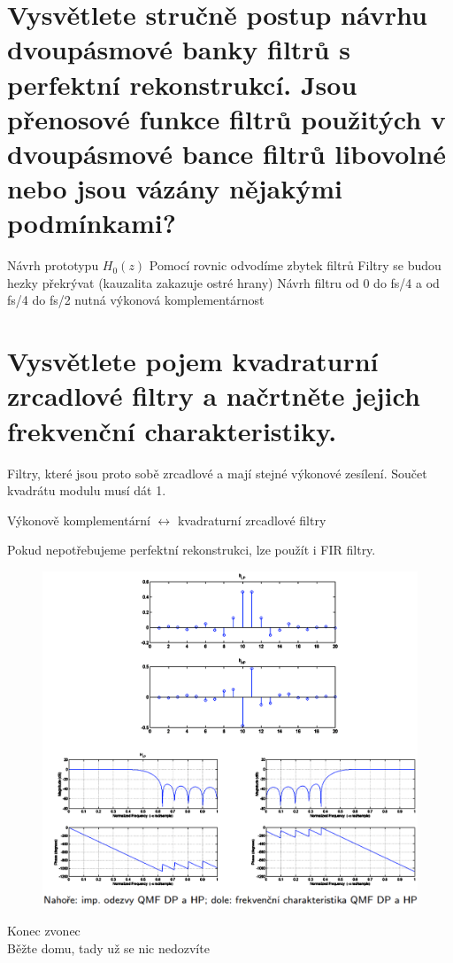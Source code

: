\documentclass[a4paper,12pt]{article}   %
\newcommand{\mt}[1]{$#1$}
\begin{document}
\FloatBarrier
\section{Vysvětlete stručně postup návrhu dvoupásmové banky filtrů s perfektní rekonstrukcí. Jsou přenosové funkce filtrů použitých v dvoupásmové bance filtrů libovolné nebo jsou vázány nějakými podmínkami?}

\begin{outline}[enumerate]
        \1 Návrh prototypu \mt{H_0(z)}
        \1 Pomocí rovnic odvodíme zbytek filtrů
                \2 Filtry se budou hezky překrývat (kauzalita zakazuje ostré hrany)
        \1 Návrh filtru od 0 do fs/4 a od fs/4 do fs/2
                \2 nutná výkonová komplementárnost
\end{outline}



\section{Vysvětlete pojem kvadraturní zrcadlové filtry a načrtněte jejich frekvenční charakteristiky.}

Filtry, které jsou proto sobě zrcadlové a mají stejné výkonové zesílení. Součet kvadrátu modulu musí dát 1. 

Výkonově komplementární \mt{\leftrightarrow} kvadraturní zrcadlové filtry

Pokud nepotřebujeme perfektní rekonstrukci, lze použít i FIR filtry.

\begin{figure}[h!]
        \centering
        \includegraphics[width=.9\textwidth]{fig/qmf.png}
\end{figure}
\FloatBarrier
\vfill
\begin{flushright}
        Konec zvonec\\
        Běžte domu, tady už se nic nedozvíte
\end{flushright}
\end{document}
